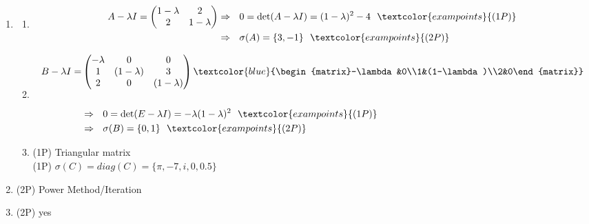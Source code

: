 {\color{solution}
\begin{enumerate}
	\item \begin{enumerate}
		\item 
		\begin{align*}
		A-\lambda I=\begin{pmatrix}1-\lambda&2\\2&1-\lambda\end{pmatrix}&\Rightarrow~~0
		=\text{det}(A-\lambda I)
		= (1-\lambda)^2 - 4~~\textcolor{exampoints}{(1P)}\\
		&\Rightarrow~~\sigma(A)=\{3,-1\}~~\textcolor{exampoints}{(2P)}
		\end{align*}
		\item 
		\begin{align*}
		B-\lambda I=&\begin{pmatrix}-\lambda&0&0\\1&(1-\lambda)&3\\2&0&(1-\lambda)\end{pmatrix}\textcolor{blue}{\begin{matrix}-\lambda&0\\1&(1-\lambda)\\2&0\end{matrix}}\\
		&\\
		&\Rightarrow~~0
		=\text{det}(E-\lambda I)
		=-\lambda(1-\lambda)^2~~\textcolor{exampoints}{(1P)}\\
		&\Rightarrow~~\sigma(B)=\{0,1\}~~\textcolor{exampoints}{( 2P)}
		\end{align*}
		\item \textcolor{exampoints}{(1P)} Triangular matrix\\
	 \textcolor{exampoints}{(1P)}	$ \sigma(C) = diag(C) = \{\pi, -7, i, 0, 0.5\}$
	\end{enumerate}
\item  \textcolor{exampoints}{(2P)} Power Method/Iteration
\item \textcolor{exampoints}{(2P)} yes
\end{enumerate}
}
